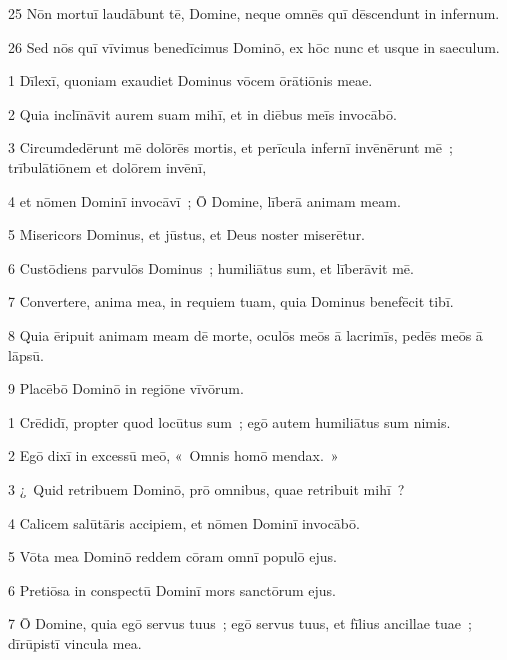 \psalmVerse
  {\phantom{0}25}
  {Nōn mortuī laudābunt tē, Domine, neque omnēs quī dēscendunt in infernum.}


\psalmVerse
  {\phantom{0}26}
  {Sed nōs quī vīvimus benedīcimus Dominō, ex hōc nunc et usque in saeculum.}



\psalmVerse
  {\phantom{00}1}
  {Dīlexī, quoniam exaudiet Dominus vōcem ōrātiōnis meae.}


\psalmVerse
  {\phantom{00}2}
  {Quia inclīnāvit aurem suam mihī, et in diēbus meīs invocābō.}


\psalmVerse
  {\phantom{00}3}
  {Circumdedērunt mē dolōrēs mortis, et perīcula infernī invēnērunt mē~; trībulātiōnem et dolōrem invēnī,}


\psalmVerse
  {\phantom{00}4}
  {et nōmen Dominī invocāvī~; Ō Domine, līberā animam meam.}


\psalmVerse
  {\phantom{00}5}
  {Misericors Dominus, et jūstus, et Deus noster miserētur.}


\psalmVerse
  {\phantom{00}6}
  {Custōdiens parvulōs Dominus~; humiliātus sum, et līberāvit mē.}


\psalmVerse
  {\phantom{00}7}
  {Convertere, anima mea, in requiem tuam, quia Dominus benefēcit tibī.}


\psalmVerse
  {\phantom{00}8}
  {Quia ēripuit animam meam dē morte, oculōs meōs ā lacrimīs, pedēs meōs ā lāpsū.}


\psalmVerse
  {\phantom{00}9}
  {Placēbō Dominō in regiōne vīvōrum.}




\psalmVerse
  {\phantom{00}1}
  {Crēdidī, propter quod locūtus sum~; egō autem humiliātus sum nimis.}


\psalmVerse
  {\phantom{00}2}
  {Egō dixī in excessū meō, «~Omnis homō mendax.~»}


\psalmVerse
  {\phantom{00}3}
  {¿~Quid retribuem Dominō, prō omnibus, quae retribuit mihī~?}


\psalmVerse
  {\phantom{00}4}
  {Calicem salūtāris accipiem, et nōmen Dominī invocābō.}


\psalmVerse
  {\phantom{00}5}
  {Vōta mea Dominō reddem cōram omnī populō ejus.}


\psalmVerse
  {\phantom{00}6}
  {Pretiōsa in conspectū Dominī mors sanctōrum ejus.}


\psalmVerse
  {\phantom{00}7}
  {Ō Domine, quia egō servus tuus~; egō servus tuus, et fīlius ancillae tuae~; dīrūpistī vincula mea.}


